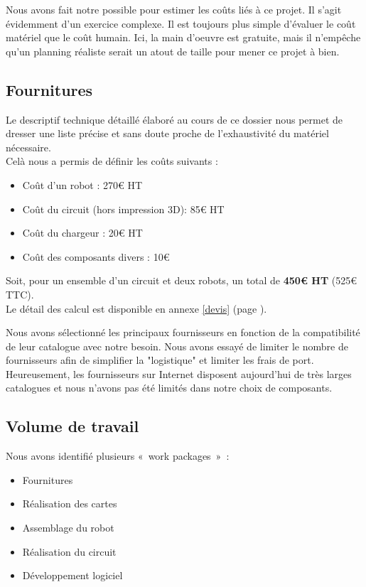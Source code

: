  Nous avons fait notre possible pour estimer les coûts liés à ce projet. Il s'agit évidemment d'un exercice complexe.
 Il est toujours plus simple d'évaluer le coût matériel que le coût humain. Ici, la main d'oeuvre est gratuite, mais il n'empêche qu'un planning réaliste serait un atout de taille pour mener ce projet à bien.

 \subsection{Fournitures}

 	Le descriptif technique détaillé élaboré au cours de ce dossier nous permet de dresser une liste précise et sans doute proche de l'exhaustivité du matériel nécessaire.\\

 	Celà nous a permis de définir les coûts suivants :
 	\begin{itemize}
 		\item Coût d'un robot : 270€ HT
 		\item Coût du circuit (hors impression 3D): 85€ HT
 		\item Coût du chargeur : 20€ HT
 		\item Coût des composants divers : 10€
 	\end{itemize}

 	\vspace{15pt}

 	Soit, pour un ensemble d'un circuit et deux robots, un total de \textbf{450€ HT} (525€ TTC).\\

 	Le détail des calcul est disponible en annexe \ref{devis} (page \pageref{devis}).



 	Nous avons sélectionné les principaux fournisseurs en fonction de la compatibilité de leur catalogue avec notre besoin.
 	Nous avons essayé de limiter le nombre de fournisseurs afin de simplifier la "logistique" et limiter les frais de port.\\

 	Heureusement, les fournisseurs sur Internet disposent aujourd'hui de très larges catalogues et nous n'avons pas été limités dans notre choix de composants.

 \subsection{Volume de travail}

 	Nous avons identifié plusieurs « work packages » :\\
 	\begin{itemize}
 		\item Fournitures
 		\item Réalisation des cartes
 		\item Assemblage du robot
 		\item Réalisation du circuit
 		\item Développement logiciel
 	\end{itemize}

